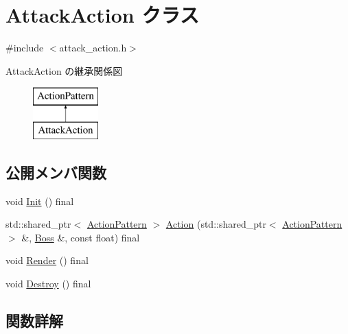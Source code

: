 \hypertarget{class_attack_action}{}\section{Attack\+Action クラス}
\label{class_attack_action}


{\ttfamily \#include $<$attack\+\_\+action.\+h$>$}

Attack\+Action の継承関係図\begin{figure}[H]
\begin{center}
\leavevmode
\includegraphics[height=2.000000cm]{class_attack_action}
\end{center}
\end{figure}
\subsection*{公開メンバ関数}
\begin{DoxyCompactItemize}
\item 
void \mbox{\hyperlink{class_attack_action_afd8d8c674040a1361c35d1703f36b30e}{Init}} () final
\item 
std\+::shared\+\_\+ptr$<$ \mbox{\hyperlink{class_action_pattern}{Action\+Pattern}} $>$ \mbox{\hyperlink{class_attack_action_a3e503ef3d5497f8a49a5273425c79476}{Action}} (std\+::shared\+\_\+ptr$<$ \mbox{\hyperlink{class_action_pattern}{Action\+Pattern}} $>$ \&, \mbox{\hyperlink{class_boss}{Boss}} \&, const float) final
\item 
void \mbox{\hyperlink{class_attack_action_a779cc8743807e3e5d01cb3dd14f92bd7}{Render}} () final
\item 
void \mbox{\hyperlink{class_attack_action_aa91f60f80fc0c76f321fbf2da3945c43}{Destroy}} () final
\end{DoxyCompactItemize}


\subsection{関数詳解}
\mbox{\label{class_attack_action_a3e503ef3d5497f8a49a5273425c79476}} 
